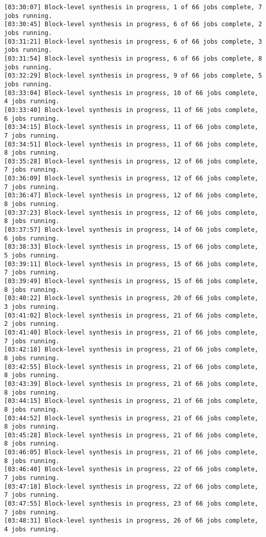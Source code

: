 \begin{center}
\begin{lstlisting}[label=lst:vlog,caption=Файл v++\_vinc.log]
[03:30:07] Block-level synthesis in progress, 1 of 66 jobs complete, 7 jobs running.
[03:30:45] Block-level synthesis in progress, 6 of 66 jobs complete, 2 jobs running.
[03:31:21] Block-level synthesis in progress, 6 of 66 jobs complete, 3 jobs running.
[03:31:54] Block-level synthesis in progress, 6 of 66 jobs complete, 8 jobs running.
[03:32:29] Block-level synthesis in progress, 9 of 66 jobs complete, 5 jobs running.
[03:33:04] Block-level synthesis in progress, 10 of 66 jobs complete, 4 jobs running.
[03:33:40] Block-level synthesis in progress, 11 of 66 jobs complete, 6 jobs running.
[03:34:15] Block-level synthesis in progress, 11 of 66 jobs complete, 7 jobs running.
[03:34:51] Block-level synthesis in progress, 11 of 66 jobs complete, 8 jobs running.
[03:35:28] Block-level synthesis in progress, 12 of 66 jobs complete, 7 jobs running.
[03:36:09] Block-level synthesis in progress, 12 of 66 jobs complete, 7 jobs running.
[03:36:47] Block-level synthesis in progress, 12 of 66 jobs complete, 8 jobs running.
[03:37:23] Block-level synthesis in progress, 12 of 66 jobs complete, 8 jobs running.
[03:37:57] Block-level synthesis in progress, 14 of 66 jobs complete, 6 jobs running.
[03:38:33] Block-level synthesis in progress, 15 of 66 jobs complete, 5 jobs running.
[03:39:11] Block-level synthesis in progress, 15 of 66 jobs complete, 7 jobs running.
[03:39:49] Block-level synthesis in progress, 15 of 66 jobs complete, 8 jobs running.
[03:40:22] Block-level synthesis in progress, 20 of 66 jobs complete, 3 jobs running.
[03:41:02] Block-level synthesis in progress, 21 of 66 jobs complete, 2 jobs running.
[03:41:40] Block-level synthesis in progress, 21 of 66 jobs complete, 7 jobs running.
[03:42:18] Block-level synthesis in progress, 21 of 66 jobs complete, 8 jobs running.
[03:42:55] Block-level synthesis in progress, 21 of 66 jobs complete, 8 jobs running.
[03:43:39] Block-level synthesis in progress, 21 of 66 jobs complete, 8 jobs running.
[03:44:15] Block-level synthesis in progress, 21 of 66 jobs complete, 8 jobs running.
[03:44:52] Block-level synthesis in progress, 21 of 66 jobs complete, 8 jobs running.
[03:45:28] Block-level synthesis in progress, 21 of 66 jobs complete, 8 jobs running.
[03:46:05] Block-level synthesis in progress, 21 of 66 jobs complete, 8 jobs running.
[03:46:40] Block-level synthesis in progress, 22 of 66 jobs complete, 7 jobs running.
[03:47:18] Block-level synthesis in progress, 22 of 66 jobs complete, 7 jobs running.
[03:47:55] Block-level synthesis in progress, 23 of 66 jobs complete, 7 jobs running.
[03:48:31] Block-level synthesis in progress, 26 of 66 jobs complete, 4 jobs running.

\end{lstlisting}
\end{center}
